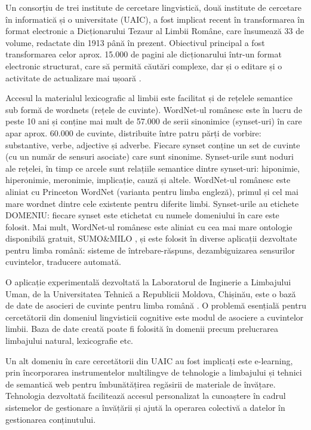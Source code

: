 \begin{multicols}{2}
Un consorțiu de trei institute de cercetare lingvistică, două institute de cercetare în informatică și o universitate (UAIC), a fost implicat recent în transformarea în format electronic a Dicționarului Tezaur al Limbii Române, care însumează 33 de volume, redactate din 1913 până în prezent. Obiectivul principal a fost transformarea celor aprox. 15.000 de pagini ale dicționarului într-un format electronic structurat, care să permită căutări complexe, dar și o editare și o activitate de actualizare mai ușoară \cite{cristea3}.

Accesul la materialul lexicografic al limbii este facilitat și de rețelele semantice sub formă de wordnets (rețele de cuvinte). WordNet-ul românesc este în lucru de peste 10 ani și conține mai mult de 57.000 de serii sinonimice (synset-uri) în care apar aprox. 60.000 de cuvinte, distribuite între patru părți de vorbire: substantive, verbe, adjective și adverbe. Fiecare synset conține un set de cuvinte (cu un număr de sensuri asociate) care sunt sinonime. Synset-urile sunt noduri ale rețelei, în timp ce arcele sunt relațiile semantice dintre synset-uri: hiponimie, hiperonimie, meronimie, implicație, cauză și altele. WordNet-ul românesc este aliniat cu Princeton WordNet \cite{wnURL} (varianta pentru limba engleză), primul și cel mai mare wordnet dintre cele existente pentru diferite limbi. Synset-urile au etichete DOMENIU: fiecare synset este etichetat cu numele domeniului în care este folosit. Mai mult, WordNet-ul românesc este aliniat cu cea mai mare ontologie disponibilă gratuit, SUMO\&MILO \cite{ro_wnURL}, și este folosit în diverse aplicații dezvoltate pentru limba română: sisteme de întrebare-răspuns, dezambiguizarea sensurilor cuvintelor, traducere automată.

O aplicație experimentală dezvoltată la Laboratorul de Inginerie a Limbajului Uman, de la Universitatea Tehnică a Republicii Moldova, Chișinău, este o bază de date de asocieri de cuvinte pentru limba română \cite{sem_dict}. O problemă esențială pentru cercetătorii din domeniul lingvisticii cognitive este modul de asociere a cuvintelor limbii. Baza de date creată poate fi folosită în domenii precum prelucrarea limbajului natural, lexicografie etc.

Un alt domeniu în care cercetătorii din UAIC au fost implicați este e-learning, prin încorporarea instrumentelor multilingve de tehnologie a limbajului și tehnici de semantică web pentru îmbunătățirea regăsirii de materiale de învățare. Tehnologia dezvoltată facilitează accesul personalizat la cunoaștere în cadrul sistemelor de gestionare a învățării și ajută la operarea colectivă a datelor în gestionarea conținutului.


\end{multicols}
